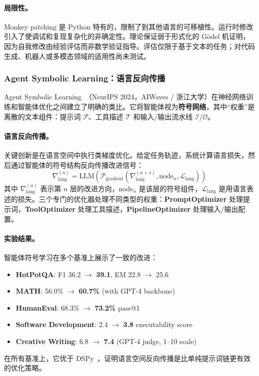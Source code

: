 \paragraph{局限性。}
Monkey patching 是 Python 特有的，限制了到其他语言的可移植性。运行时修改引入了使调试和复现复杂化的非确定性。理论保证弱于形式化的 G\"{o}del 机证明，因为自我修改由经验评估而非数学验证指导。评估仅限于基于文本的任务；对代码生成、机器人或多模态领域的适用性尚未测试。


\subsubsection{Agent Symbolic Learning：语言反向传播}

Agent Symbolic Learning~\citep{agentsymboliclearning2024}（NeurIPS 2024，AIWaves / 浙江大学）在神经网络训练和智能体优化之间建立了明确的类比。它将智能体视为\textbf{符号网络}，其中``权重''是离散的文本组件：提示词 $\mathcal{P}$、工具描述 $\mathcal{T}$ 和输入/输出流水线 $\mathcal{I}/\mathcal{O}$。

\paragraph{语言反向传播。}
关键创新是在语言空间中执行类梯度优化。给定任务轨迹，系统计算语言损失，然后通过智能体的符号结构反向传播改进信号：
\begin{equation}
\nabla_{\text{lang}}^{(n)} = \text{LLM}\left(\mathcal{P}_{\text{gradient}}(\nabla_{\text{lang}}^{(n+1)}, \text{node}_n, \mathcal{L}_{\text{lang}})\right)
\end{equation}
其中 $\nabla_{\text{lang}}^{(n)}$ 表示第 $n$ 层的改进方向，$\text{node}_n$ 是该层的符号组件，$\mathcal{L}_{\text{lang}}$ 是用语言表述的损失。三个专门的优化器处理不同类型的权重：\textbf{PromptOptimizer} 处理提示词，\textbf{ToolOptimizer} 处理工具描述，\textbf{PipelineOptimizer} 处理输入/输出配置。

\paragraph{实验结果。}
智能体符号学习在多个基准上展示了一致的改进：
\begin{itemize}
    \item \textbf{HotPotQA}: F1 36.2 $\rightarrow$ \textbf{39.1}, EM 22.8 $\rightarrow$ 25.6
    \item \textbf{MATH}: 56.0\% $\rightarrow$ \textbf{60.7\%} (with GPT-4 backbone)
    \item \textbf{HumanEval}: 68.3\% $\rightarrow$ \textbf{73.2\%} pass@1
    \item \textbf{Software Development}: 2.4 $\rightarrow$ \textbf{3.8} executability score
    \item \textbf{Creative Writing}: 6.8 $\rightarrow$ \textbf{7.4} (GPT-4 judge, 1--10 scale)
\end{itemize}
在所有基准上，它优于 DSPy~\citep{khattab2023dspy}，证明语言空间反向传播是比单纯提示词链更有效的优化策略。

